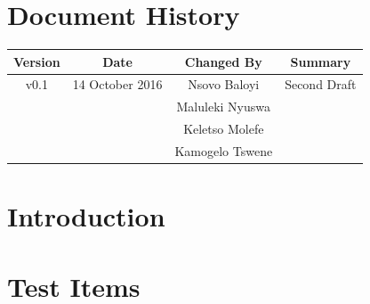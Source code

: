 \documentclass[a4paper,12pt]{article}
\begin{document}
	\newpage
	
	\tableofcontents
	\newpage
	
	
	\section*{Document History}
	
	\begin{table}[h!]
		
		\centering %
		\begin{tabular}{c c c c} %
			\hline\hline %
			Version & Date & Changed By & Summary \\ [0.5ex] %
			\hline %
			v0.1 & 14 October 2016 & Nsovo Baloyi & Second Draft 
			\\ & & Maluleki Nyuswa &  
			\\ & & Keletso Molefe &
			\\ & & Kamogelo Tswene & \\ [1ex] 
			\hline
		\end{tabular}
		\label{table:nonlin} %
	\end{table}

	\newpage
	
	\section{Introduction}	
	
	
	
	
	\section{Test Items}	
		
	
	
	
\end{document}
